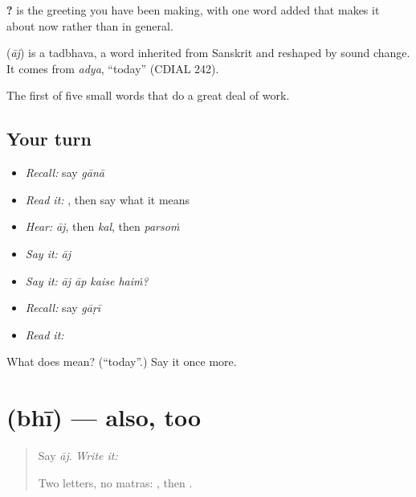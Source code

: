 \textbf{   ?} is the greeting you have been making, with one word added that makes it about now rather than in general.

\begin{cousinweb}
\textbf{} (\emph{āj}) is a tadbhava, a word inherited from Sanskrit and reshaped by sound change. It comes from \emph{adya}, \textquotedblleft{}today\textquotedblright{} (CDIAL 242).
\end{cousinweb}

\begin{grammarlens}[title={What you've built}]
The first of five small words that do a great deal of work.
\end{grammarlens}

\subsection*{Your turn}
\begin{itemize}
\raggedright
  \item \emph{Recall:} say \emph{gānā}
  \item \emph{Read it:} \textbf{}, then say what it means
  \item \emph{Hear:} \emph{āj}, then \emph{kal}, then \emph{parsoṁ}
  \item \emph{Say it:} \emph{āj}
  \item \emph{Say it:} \emph{āj āp kaise haiṁ?}
  \item \emph{Recall:} say \emph{gāṛī}
  \item \emph{Read it:} \textbf{}
\end{itemize}

\begin{tcolorbox}[breakable,colback=teal!4,colframe=teal!35!black,title={Before you move on}]
What does  mean? (\textquotedblleft{}today\textquotedblright{}.) Say it once more.
\end{tcolorbox}
\section[\texorpdfstring{\hi{भी} (bhī)}{भी (bhī)}]{ (bhī) — also, too}

\label{lesson:HI-C71-also}



\begin{quote}
Say \emph{āj}. \emph{Write it:} \textbf{}

Two letters, no matras: , then .
\end{quote}

